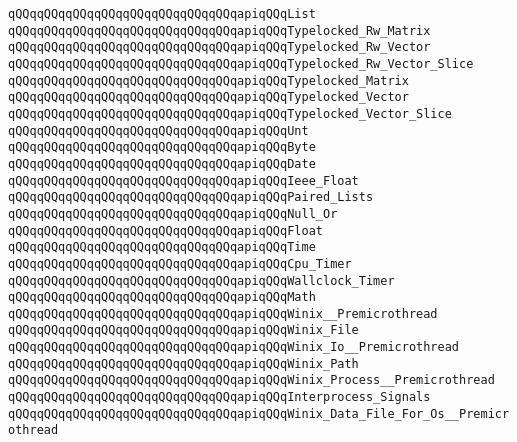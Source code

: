 \verb|qQQqqQQqqQQqqQQqqQQqqQQqqQQqqQQqapiqQQqList|\newline
\verb|qQQqqQQqqQQqqQQqqQQqqQQqqQQqqQQqapiqQQqTypelocked_Rw_Matrix|\newline
\verb|qQQqqQQqqQQqqQQqqQQqqQQqqQQqqQQqapiqQQqTypelocked_Rw_Vector|\newline
\verb|qQQqqQQqqQQqqQQqqQQqqQQqqQQqqQQqapiqQQqTypelocked_Rw_Vector_Slice|\newline
\verb|qQQqqQQqqQQqqQQqqQQqqQQqqQQqqQQqapiqQQqTypelocked_Matrix|\newline
\verb|qQQqqQQqqQQqqQQqqQQqqQQqqQQqqQQqapiqQQqTypelocked_Vector|\newline
\verb|qQQqqQQqqQQqqQQqqQQqqQQqqQQqqQQqapiqQQqTypelocked_Vector_Slice|\newline
\verb|qQQqqQQqqQQqqQQqqQQqqQQqqQQqqQQqapiqQQqUnt|\newline
\verb|qQQqqQQqqQQqqQQqqQQqqQQqqQQqqQQqapiqQQqByte|\newline
\verb|qQQqqQQqqQQqqQQqqQQqqQQqqQQqqQQqapiqQQqDate|\newline
\verb|qQQqqQQqqQQqqQQqqQQqqQQqqQQqqQQqapiqQQqIeee_Float|\newline
\verb|qQQqqQQqqQQqqQQqqQQqqQQqqQQqqQQqapiqQQqPaired_Lists|\newline
\verb|qQQqqQQqqQQqqQQqqQQqqQQqqQQqqQQqapiqQQqNull_Or|\newline
\verb|qQQqqQQqqQQqqQQqqQQqqQQqqQQqqQQqapiqQQqFloat|\newline
\verb|qQQqqQQqqQQqqQQqqQQqqQQqqQQqqQQqapiqQQqTime|\newline
\verb|qQQqqQQqqQQqqQQqqQQqqQQqqQQqqQQqapiqQQqCpu_Timer|\newline
\verb|qQQqqQQqqQQqqQQqqQQqqQQqqQQqqQQqapiqQQqWallclock_Timer|\newline
\verb|qQQqqQQqqQQqqQQqqQQqqQQqqQQqqQQqapiqQQqMath|\newline
\verb|qQQqqQQqqQQqqQQqqQQqqQQqqQQqqQQqapiqQQqWinix__Premicrothread|\newline
\verb|qQQqqQQqqQQqqQQqqQQqqQQqqQQqqQQqapiqQQqWinix_File|\newline
\verb|qQQqqQQqqQQqqQQqqQQqqQQqqQQqqQQqapiqQQqWinix_Io__Premicrothread|\newline
\verb|qQQqqQQqqQQqqQQqqQQqqQQqqQQqqQQqapiqQQqWinix_Path|\newline
\verb|qQQqqQQqqQQqqQQqqQQqqQQqqQQqqQQqapiqQQqWinix_Process__Premicrothread|\newline
\verb|qQQqqQQqqQQqqQQqqQQqqQQqqQQqqQQqapiqQQqInterprocess_Signals|\newline
\verb|qQQqqQQqqQQqqQQqqQQqqQQqqQQqqQQqapiqQQqWinix_Data_File_For_Os__Premicrothread|\newline
